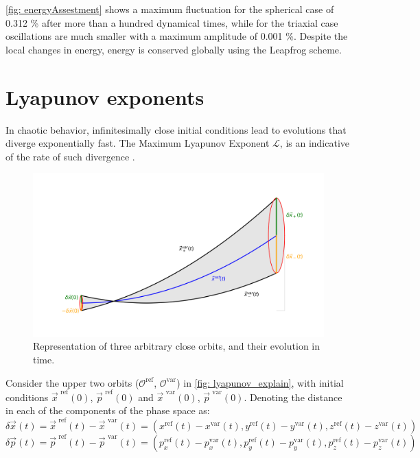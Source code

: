 	\autoref{fig: energyAssestment} shows a maximum fluctuation for the spherical case of 0.312 \% after more than a hundred dynamical times, while for the triaxial case oscillations are much smaller with a maximum amplitude of 0.001 \%. Despite the local changes in energy, energy is conserved globally using the Leapfrog scheme.

\chapter{Lyapunov exponents}
	In chaotic behavior, infinitesimally close initial conditions lead to evolutions that diverge exponentially fast. The Maximum Lyapunov Exponent $\mathcal{L}$, is an indicative of the rate of such divergence \cite{morbidelli2002modern}.
	\begin{figure}[h]
		\centering
		\includegraphics[width = 0.7\linewidth]{"../Files/Week 9/lyapunov_explain"}
		\caption{Representation of three arbitrary close orbits, and their evolution in time.}
		\label{fig: lyapunov_explain}
	\end{figure}
	
	Consider the upper two orbits ($\mathcal{O}^\text{ref}$, $\mathcal{O}^\text{var}$) in \autoref{fig: lyapunov_explain}, with initial conditions $\vec{x}^\text{ ref}(0)$, $\vec{p}^\text{ ref}(0)$ and $\vec{x}^\text{ var}(0)$, $\vec{p}^\text{ var}(0)$. Denoting the distance in each of the components of the phase space as:
	\begin{equation}\label{eq: deltax}
		\delta\vec{x}(t) = \vec{x}^\text{ ref}(t) - \vec{x}^\text{ var}(t) = \left(x^\text{ref}(t) - x^\text{var}(t), y^\text{ref}(t) - y^\text{var}(t), z^\text{ref}(t) - z^\text{var}(t)\right)
	\end{equation}
	\begin{equation}\label{eq: deltap}
		\delta\vec{p}(t) = \vec{p}^\text{ ref}(t) - \vec{p}^\text{ var}(t) = \left(p_x^\text{ref}(t) - p_x^\text{var}(t), p_y^\text{ref}(t) - p_y^\text{var}(t), p_z^\text{ref}(t) - p_z^\text{var}(t)\right)
	\end{equation}
	
